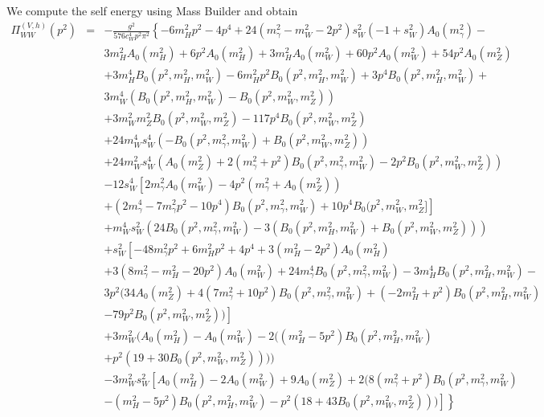 \documentclass[11pt]{article}
\newcommand{\mb}{\textsf{Mass Builder} }
\begin{document}
We compute the self energy using \mb and obtain
{
\begin{eqnarray}
\Pi_{WW}^{(V,h)}(p^2) &=& 
-\frac{ g^2} {576 c_W^4 p^2 \pi^2}\left\{ -6 m_H^2 p^2 - 4 p^4 \right.+  24 (m_{\gamma}^2 - m_W^2 - 2 p^2) s_W^2 (-1 + s_W^2) A_0(m_{\gamma}^2) -  \nonumber\\
&&   3 m_H^2 A_0(m_H^2) + 6 p^2 A_0(m_H^2) + 3 m_H^2 A_0(m_W^2) + 60 p^2 A_0(m_W^2) + 54 p^2 A_0(m_Z^2)\nonumber \\
&&   + 3 m_H^4 B_0(p^2, m_H^2, m_W^2) -6 m_H^2 p^2 B_0(p^2, m_H^2, m_W^2) + 3 p^4 B_0(p^2, m_H^2, m_W^2) + \nonumber\\
&&   3 m_W^4 (B_0(p^2, m_H^2, m_W^2) - B_0(p^2, m_W^2, m_Z^2))\nonumber \\
&&   + 3 m_W^2 m_Z^2 B_0(p^2, m_W^2, m_Z^2) - 117 p^4 B_0(p^2, m_W^2, m_Z^2) \nonumber\\
&&   + 24 m_W^4 s_W^4 (-B_0(p^2, m_{\gamma}^2, m_W^2) + B_0(p^2, m_W^2, m_Z^2))\nonumber \\
&&   + 24 m_W^2 s_W^4 (A_0(m_Z^2) + 2 (m_{\gamma}^2 + p^2) B_0(p^2, m_{\gamma}^2, m_W^2) - 2 p^2 B_0(p^2, m_W^2, m_Z^2))\nonumber \\
&&   - 12 s_W^4 \left[    2 m_{\gamma}^2 A_0(m_W^2) -  4 p^2 (m_{\gamma}^2 + A_0(m_Z^2)) \right.\nonumber \\
&& \left. + (2 m_{\gamma}^4 - 7 m_{\gamma}^2 p^2 - 10 p^4) B_0(p^2,m_{\gamma}^2, m_W^2) + 10 p^4 B_0(p^2, m_W^2, m_Z^2]\right] \nonumber\\
&&  + m_W^4 s_W^2 (24 B_0(p^2, m_{\gamma}^2, m_W^2) - 3 (B_0(p^2, m_H^2, m_W^2) + B_0(p^2, m_W^2, m_Z^2))) \nonumber\\
&&   +  s_W^2 \left[-48 m_{\gamma}^2 p^2 + 6 m_H^2 p^2 + 4 p^4 +  3 (m_H^2 - 2 p^2) A_0(m_H^2)
\right.\nonumber\\
&&   +  3 (8 m_{\gamma}^2 - m_H^2 - 20 p^2) A_0(m_W^2) +   24 m_{\gamma}^4 B_0(p^2, m_{\gamma}^2, m_W^2) - 3 m_H^4 B_0(p^2, m_H^2, m_W^2) - \nonumber\\
&&    3 p^2 (34 A_0(m_Z^2) + 4 (7 m_{\gamma}^2 + 10 p^2) B_0(p^2, m_{\gamma}^2, m_W^2) + (-2 m_H^2 + p^2) B_0(p^2, m_H^2, m_W^2) \nonumber\\
&& \left.- 79 p^2 B_0(p^2, m_W^2, m_Z^2))\right]    \nonumber\\
&& +  3 m_W^2 (A_0(m_H^2) - A_0(m_W^2) -  2 ((m_H^2 - 5 p^2) B_0(p^2, m_H^2, m_W^2)\nonumber\\
&&       + p^2 (19 + 30 B_0(p^2, m_W^2, m_Z^2))))\nonumber \\
&&     - 3 m_W^2 s_W^2 \left[A_0(m_H^2) - 2 A_0(m_W^2) + 9 A_0(m_Z^2) + 2 (8 (m_{\gamma}^2 + p^2) B_0(p^2, m_{\gamma}^2, m_W^2) \right.\nonumber\\
&& \left. \left .- (m_H^2 - 5 p^2) B_0(p^2, m_H^2, m_W^2) - p^2 (18 + 43 B_0(p^2, m_W^2, m_Z^2)))\right] \right\}\label{eqn:mb_WW}
\end{eqnarray}
}
\end{document}
